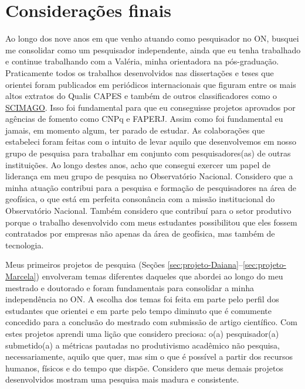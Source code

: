 \renewcommand{\chaptername}{Capítulo}
\chapter{Considerações finais}
\renewcommand{\chaptername}{Considerações finais}
\label{cap:consideracoes-finais}

Ao longo dos nove anos em que venho atuando como pesquisador no ON, 
busquei me consolidar como um pesquisador independente, ainda que eu tenha trabalhado
e continue trabalhando com a Valéria, minha orientadora na pós-graduação.
Praticamente todos os trabalhos desenvolvidos nas dissertações e teses que 
orientei foram publicados em periódicos internacionais que figuram entre 
os mais altos extratos do Qualis CAPES e também de outros classificadores como
o \href{https://www.scimagojr.com/}{SCIMAGO}.
Isso foi fundamental para que eu conseguisse projetos aprovados por agências de fomento
como CNPq e FAPERJ.
Assim como foi fundamental eu jamais, em momento algum, ter parado de estudar.
As colaborações que estabeleci foram feitas com o intuito de levar aquilo que 
desenvolvemos em nosso grupo de pesquisa para trabalhar em conjunto com 
pesquisadores(as) de outras instituições. 
Ao longo destes anos, acho que consegui exercer um papel de liderança 
em meu grupo de pesquisa no Observatório Nacional.
Considero que a minha atuação contribui para a pesquisa e formação de pesquisadores na 
área de geofísica, o que está em perfeita consonância com a missão institucional do
Observatório Nacional. Também considero que contribuí para o setor produtivo porque
o trabalho desenvolvido com meus estudantes possibilitou que eles fossem contratados
por empresas não apenas da área de geofísica, mas também de tecnologia.

\bigskip

\noindent Meus primeiros projetos de pesquisa 
(Seções \ref{sec:projeto-Daiana}--\ref{sec:projeto-Marcela}) envolveram 
temas diferentes daqueles que abordei ao longo do meu mestrado e doutorado e
foram fundamentais para consolidar a minha independência no ON.
A escolha dos temas foi feita em parte pelo perfil dos 
estudantes que orientei e em parte pelo tempo diminuto que é comumente concedido 
para a conclusão do mestrado com submissão de artigo científico. 
Com estes projetos aprendi uma lição que considero preciosa: o(a) pesquisador(a) 
submetido(a) a métricas pautadas no produtivismo acadêmico não pesquisa, necessariamente, 
aquilo que quer, mas sim o que é possível a partir dos recursos humanos, físicos e do
tempo que dispõe. Considero que meus demais projetos desenvolvidos mostram
uma pesquisa mais madura e consistente.


